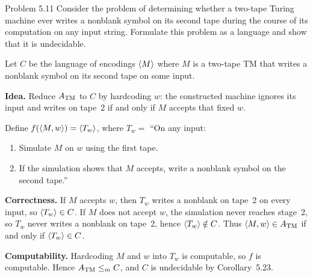\begin{question}{Problem 5.11}
Consider the problem of determining whether a two-tape Turing machine ever writes a nonblank symbol on its second tape during the course of its computation on any input string. Formulate this problem as a language and show that it is undecidable.
\end{question}
\begin{soln}
Let $C$ be the language of encodings $\langle M\rangle$ where $M$ is a two-tape TM that writes a nonblank symbol on its second tape on some input.

\textbf{Idea.} Reduce $A_{\mathrm{TM}}$ to $C$ by hardcoding $w$: the constructed machine ignores its input and writes on tape~2 if and only if $M$ accepts that fixed $w$.

Define $f(\langle M,w\rangle)=\langle T_w\rangle$, where
$T_w=$ ``On any input:
\begin{enumerate}
\item Simulate $M$ on $w$ using the first tape.
\item If the simulation shows that $M$ accepts, write a nonblank symbol on the second tape.''
\end{enumerate}

\textbf{Correctness.}
If $M$ accepts $w$, then $T_w$ writes a nonblank on tape~2 on every input, so $\langle T_w\rangle\in C$.
If $M$ does not accept $w$, the simulation never reaches stage~2, so $T_w$ never writes a nonblank on tape~2, hence $\langle T_w\rangle\notin C$.
Thus $\langle M,w\rangle\in A_{\mathrm{TM}}$ if and only if $\langle T_w\rangle\in C$.

\textbf{Computability.} Hardcoding $M$ and $w$ into $T_w$ is computable, so $f$ is computable. Hence $A_{\mathrm{TM}}\le_{m} C$, and $C$ is undecidable by Corollary~5.23.
\end{soln}

